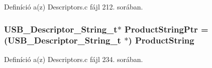 Definíció a(z) Descriptors.\-c fájl 212. sorában.

\subsubsection[{Product\-String\-Ptr}]{\setlength{\rightskip}{0pt plus 5cm}U\-S\-B\-\_\-\-Descriptor\-\_\-\-String\-\_\-t$\ast$ Product\-String\-Ptr = (U\-S\-B\-\_\-\-Descriptor\-\_\-\-String\-\_\-t $\ast$) {\bf Product\-String}}\label{_descriptors_8c_aa7a5f39bd07b0c4ded3f6f7f797b1d92}


Definíció a(z) Descriptors.\-c fájl 234. sorában.

